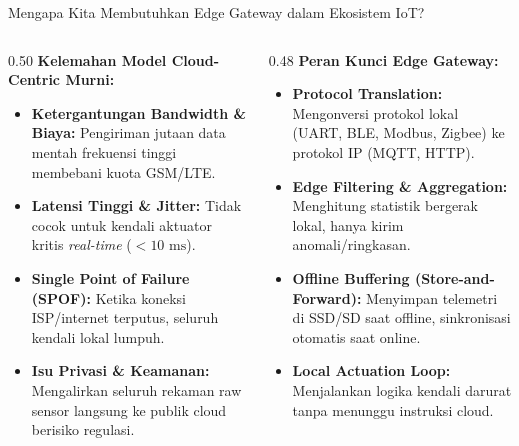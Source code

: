 \documentclass[aspectratio=169,10pt]{beamer}
\begin{document}
\begin{frame}{Mengapa Kita Membutuhkan Edge Gateway dalam Ekosistem IoT?}
    \begin{columns}[T]
        \begin{column}{0.50\textwidth}
            \textbf{Kelemahan Model Cloud-Centric Murni:}
            \begin{itemize}
                \item \textbf{Ketergantungan Bandwidth \& Biaya:} Pengiriman jutaan data mentah frekuensi tinggi membebani kuota GSM/LTE.
                \item \textbf{Latensi Tinggi \& Jitter:} Tidak cocok untuk kendali aktuator kritis \textit{real-time} ($<10\text{ ms}$).
                \item \textbf{Single Point of Failure (SPOF):} Ketika koneksi ISP/internet terputus, seluruh kendali lokal lumpuh.
                \item \textbf{Isu Privasi \& Keamanan:} Mengalirkan seluruh rekaman raw sensor langsung ke publik cloud berisiko regulasi.
            \end{itemize}
        \end{column}
        \begin{column}{0.48\textwidth}
            \textbf{Peran Kunci Edge Gateway:}
            \begin{itemize}
                \item \textbf{Protocol Translation:} Mengonversi protokol lokal (UART, BLE, Modbus, Zigbee) ke protokol IP (MQTT, HTTP).
                \item \textbf{Edge Filtering \& Aggregation:} Menghitung statistik bergerak lokal, hanya kirim anomali/ringkasan.
                \item \textbf{Offline Buffering (Store-and-Forward):} Menyimpan telemetri di SSD/SD saat offline, sinkronisasi otomatis saat online.
                \item \textbf{Local Actuation Loop:} Menjalankan logika kendali darurat tanpa menunggu instruksi cloud.
            \end{itemize}
        \end{column}
    \end{columns}
\end{frame}
\end{document}
